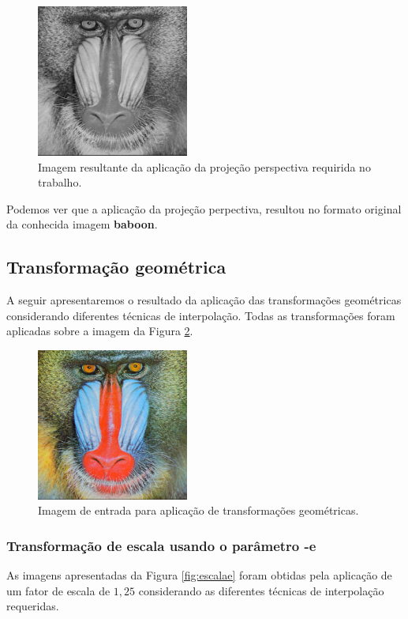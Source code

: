 \documentclass{article}
\begin{document}
\begin{figure}[!htp]%
	\centering
	\includegraphics[width=5cm]{baboon_perspectiva_result.png}
	\caption{Imagem resultante da aplicação da projeção perspectiva requirida no trabalho.}%
	\label{fig:projpersres}%
\end{figure}

\noindent
Podemos ver que a aplicação da projeção perpectiva, resultou no formato original da conhecida imagem \textbf{baboon}.


\subsection{Transformação geométrica}
A seguir apresentaremos o resultado da aplicação das transformações geométricas considerando diferentes técnicas de interpolação. Todas as transformações foram aplicadas sobre a imagem da Figura \ref{fig:projgeoini}.

\begin{figure}[!htp]%
	\centering
	\includegraphics[width=5cm]{baboon.png}
	\caption{Imagem de entrada para aplicação de transformações geométricas.}%
	\label{fig:projgeoini}%
\end{figure}

\newpage
\subsubsection{Transformação de escala usando o parâmetro -e}
As imagens apresentadas da Figura \ref{fig:escalae} foram obtidas pela aplicação de um fator de escala de $1,25$ considerando as diferentes técnicas de interpolação requeridas.
\end{document}
